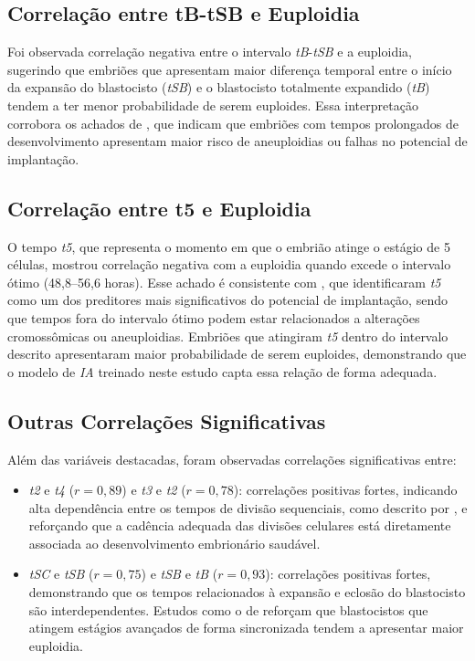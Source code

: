 \subsection{Correlação entre tB-tSB e Euploidia}
Foi observada correlação negativa entre o intervalo \textit{tB}-\textit{tSB} e a euploidia, sugerindo que embriões que apresentam maior diferença temporal entre o início da expansão do blastocisto (\textit{tSB}) e o blastocisto totalmente expandido (\textit{tB}) tendem a ter menor probabilidade de serem euploides. Essa interpretação corrobora os achados de , que indicam que embriões com tempos prolongados de desenvolvimento apresentam maior risco de aneuploidias ou falhas no potencial de implantação.

\subsection{Correlação entre t5 e Euploidia}
O tempo \textit{t5}, que representa o momento em que o embrião atinge o estágio de 5 células, mostrou correlação negativa com a euploidia quando excede o intervalo ótimo (48{,}8--56{,}6 horas). Esse achado é consistente com , que identificaram \textit{t5} como um dos preditores mais significativos do potencial de implantação, sendo que tempos fora do intervalo ótimo podem estar relacionados a alterações cromossômicas ou aneuploidias. Embriões que atingiram \textit{t5} dentro do intervalo descrito apresentaram maior probabilidade de serem euploides, demonstrando que o modelo de \textit{IA} treinado neste estudo capta essa relação de forma adequada.

\subsection{Outras Correlações Significativas}
Além das variáveis destacadas, foram observadas correlações significativas entre:

\begin{itemize}
    \item \textit{t2} e \textit{t4} ($r=0{,}89$) e \textit{t3} e \textit{t2} ($r=0{,}78$): correlações positivas fortes, indicando alta dependência entre os tempos de divisão sequenciais, como descrito por , e reforçando que a cadência adequada das divisões celulares está diretamente associada ao desenvolvimento embrionário saudável.
    \item \textit{tSC} e \textit{tSB} ($r=0{,}75$) e \textit{tSB} e \textit{tB} ($r=0{,}93$): correlações positivas fortes, demonstrando que os tempos relacionados à expansão e eclosão do blastocisto são interdependentes. Estudos como o de  reforçam que blastocistos que atingem estágios avançados de forma sincronizada tendem a apresentar maior euploidia.
\end{itemize}

